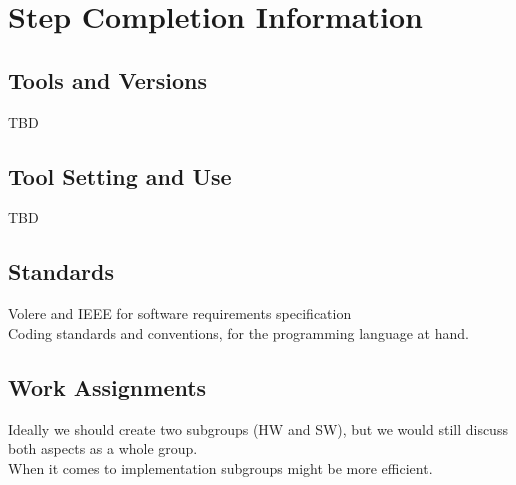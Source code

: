 \documentclass [12pt]{article}
\begin{document}




\section{Step Completion Information}

\subsection{Tools and Versions}
TBD

\subsection{Tool Setting and Use}
TBD


\subsection{Standards}
Volere and IEEE for software requirements specification \\
Coding standards and conventions, for the programming language at hand.\\

\subsection{Work Assignments}

Ideally we should create two subgroups (HW and SW), but we would still
discuss both aspects as a whole group.\\ When it comes to implementation subgroups might be more efficient. \\
\end{document}
